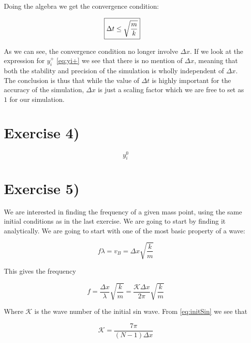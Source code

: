 \documentclass[a4paper,norsk, 10pt]{article}
\begin{document}
Doing the algebra we get the convergence condition:

\begin{align}
\Aboxed{
\Delta t \leq \sqrt{\frac{m}{k}}
}
\label{eq:maxDt}
\end{align}

As we can see, the convergence condition no longer involve $\Delta x$. If we look at the expression for $y_i^+$ \eqref{eq:yi+} we see that there is no mention of $\Delta x$, meaning that both the stability and precision of the simulation is wholly independent of $\Delta x$.\\

The conclusion is thus that while the value of $\Delta t$ is highly important for the accuracy of the simulation, $\Delta x$ is just a scaling factor which we are free to set as $1$ for our simulation.

\newpage


\section{Exercise 4)}

\begin{equation}
y_i^0
\label{eq:initSin}
\end{equation}

\section{Exercise 5)}

We are interested in finding the frequency of a given mass point, using the same initial conditions as in the last exercise. We are going to start by finding it analytically. We are going to start with one of the most basic property of a wave:

\begin{equation}
f\lambda = v_B = \Delta x\sqrt{\frac{k}{m}}
\end{equation}

This gives the frequency

\begin{equation}
f = \frac{\Delta x}{\lambda}\sqrt{\frac{k}{m}} = \frac{\mathcal{K}\Delta x}{2\pi}\sqrt{\frac{k}{m}}
\end{equation}

Where $\mathcal{K}$ is the wave number of the initial sin wave. From \eqref{eq:initSin} we see that

\begin{equation}
\mathcal{K} = \frac{7\pi}{(N-1)\Delta x}
\end{equation}
\end{document}
